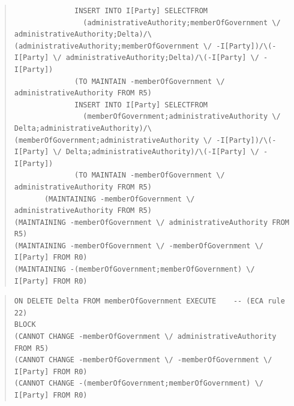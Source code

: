 \documentclass[10pt,a4paper]{report}              %
\theoremstyle{plain}\theorembodyfont{\rmfamily}\newtheorem{definition}{Definition}[section]
\theoremstyle{plain}\theorembodyfont{\rmfamily}\newtheorem{designrule}[definition]{Requirement}
\begin{document}
\begin{quote}
\begin{verbatim}
              INSERT INTO I[Party] SELECTFROM
                (administrativeAuthority;memberOfGovernment \/ administrativeAuthority;Delta)/\(administrativeAuthority;memberOfGovernment \/ -I[Party])/\(-I[Party] \/ administrativeAuthority;Delta)/\(-I[Party] \/ -I[Party])
              (TO MAINTAIN -memberOfGovernment \/ administrativeAuthority FROM R5)
              INSERT INTO I[Party] SELECTFROM
                (memberOfGovernment;administrativeAuthority \/ Delta;administrativeAuthority)/\(memberOfGovernment;administrativeAuthority \/ -I[Party])/\(-I[Party] \/ Delta;administrativeAuthority)/\(-I[Party] \/ -I[Party])
              (TO MAINTAIN -memberOfGovernment \/ administrativeAuthority FROM R5)
       (MAINTAINING -memberOfGovernment \/ administrativeAuthority FROM R5)
(MAINTAINING -memberOfGovernment \/ administrativeAuthority FROM R5)
(MAINTAINING -memberOfGovernment \/ -memberOfGovernment \/ I[Party] FROM R0)
(MAINTAINING -(memberOfGovernment;memberOfGovernment) \/ I[Party] FROM R0)
\end{verbatim}
\end{quote}
\begin{quote}
\begin{verbatim}
ON DELETE Delta FROM memberOfGovernment EXECUTE    -- (ECA rule 22)
BLOCK
(CANNOT CHANGE -memberOfGovernment \/ administrativeAuthority FROM R5)
(CANNOT CHANGE -memberOfGovernment \/ -memberOfGovernment \/ I[Party] FROM R0)
(CANNOT CHANGE -(memberOfGovernment;memberOfGovernment) \/ I[Party] FROM R0)
\end{verbatim}
\end{quote}
\end{document}
